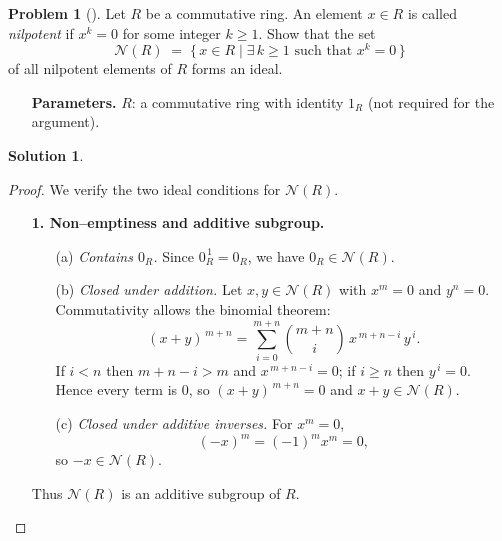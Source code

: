\documentclass[12pt]{article}
\theoremstyle{definition} %
\newtheorem{solution}{Solution}
\newtheorem{problem}{Problem}
\theoremstyle{plain} %
\begin{document}
\begin{problem}[]
  Let $R$ be a commutative ring.  
  An element $x\in R$ is called \emph{nilpotent} if $x^{k}=0$ for some integer $k\ge 1$.  
  Show that the set
  \[
      \mathcal{N}(R) \;=\; \{\,x\in R \mid \exists\,k\ge 1\text{ such that }x^{k}=0\,\}
  \]
  of all nilpotent elements of $R$ forms an ideal.
  \begin{enumerate}
      \item[\textbf{Parameters.}]
            $R$: a commutative ring with identity $1_R$ (not required for the argument).
  \end{enumerate}
\end{problem}
\begin{solution}


\begin{proof}
  We verify the two ideal conditions for $\mathcal{N}(R)$.

  \begin{enumerate}
      \item[\textbf{1.  Non--emptiness and additive subgroup.}]
            \begin{enumerate}
                \item[(a)] \emph{Contains $0_R$.}  
                          Since $0_R^{\,1}=0_R$, we have $0_R\in\mathcal{N}(R)$.
                \item[(b)] \emph{Closed under addition.}  
                          Let $x,y\in\mathcal{N}(R)$ with $x^{m}=0$ and $y^{n}=0$.  
                          Commutativity allows the binomial theorem:
                          \[
                              (x+y)^{\,m+n}
                              =\sum_{i=0}^{m+n}\binom{m+n}{i}\,x^{\,m+n-i}\,y^{\,i}.
                          \]
                          If $i<n$ then $m+n-i>m$ and $x^{\,m+n-i}=0$;   
                          if $i\ge n$ then $y^{\,i}=0$.  
                          Hence every term is $0$, so $(x+y)^{\,m+n}=0$ and $x+y\in\mathcal{N}(R)$.
                \item[(c)] \emph{Closed under additive inverses.}  
                          For $x^{m}=0$,
                          \[
                              (-x)^{m}=(-1)^{m}x^{m}=0,
                          \]
                          so $-x\in\mathcal{N}(R)$.
            \end{enumerate}
            Thus $\mathcal{N}(R)$ is an additive subgroup of $R$.


\end{enumerate}
\end{proof}
\end{solution}
\end{document}
